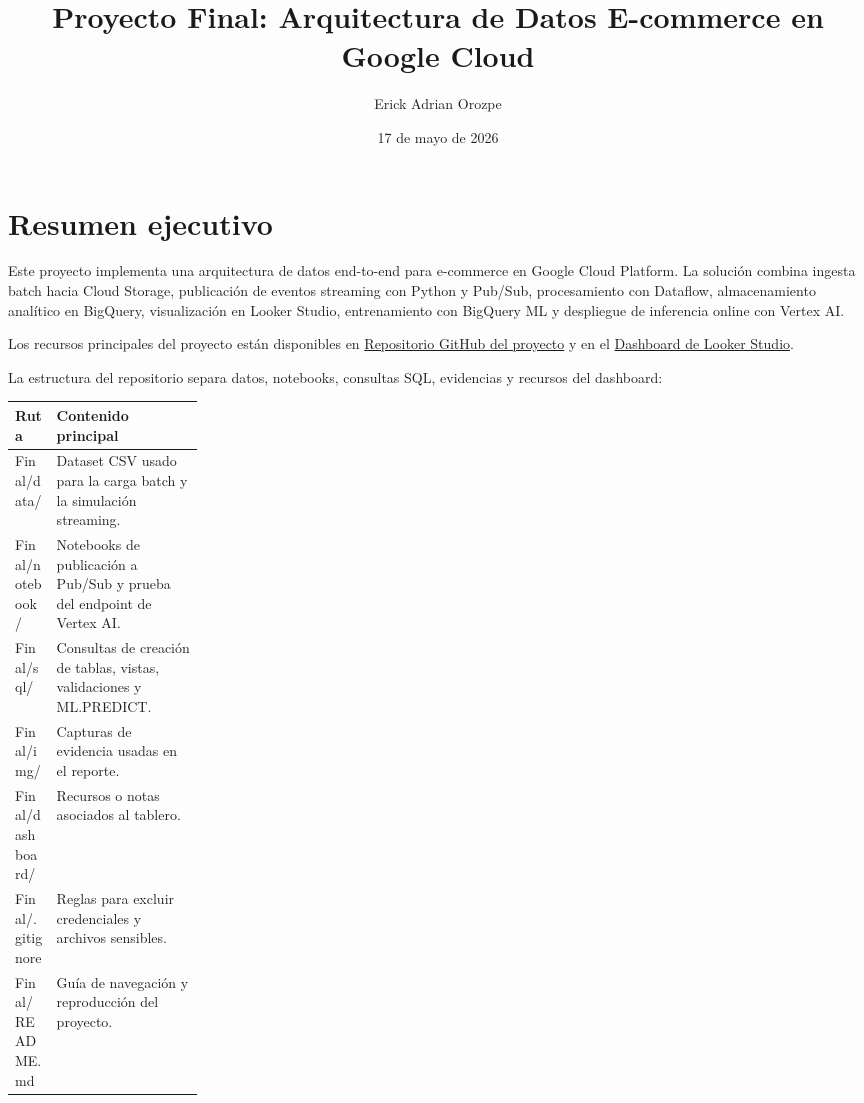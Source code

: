 \documentclass[11pt,letterpaper]{article}
\title{Proyecto Final: Arquitectura de Datos E-commerce en Google Cloud}
\author{Erick Adrian Orozpe}
\date{17 de mayo de 2026}
\begin{document}
\maketitle
\tableofcontents
\newpage

\section*{Resumen ejecutivo}
Este proyecto implementa una arquitectura de datos end-to-end para e-commerce en Google Cloud Platform. La solución combina ingesta batch hacia Cloud Storage, publicación de eventos streaming con Python y Pub/Sub, procesamiento con Dataflow, almacenamiento analítico en BigQuery, visualización en Looker Studio, entrenamiento con BigQuery ML y despliegue de inferencia online con Vertex AI.

Los recursos principales del proyecto están disponibles en \href{https://github.com/Wsm-erick/Certificado/tree/main/Final}{Repositorio GitHub del proyecto} y en el \href{https://datastudio.google.com/reporting/63d4486c-b05e-4c78-a333-cd320dcde35b}{Dashboard de Looker Studio}.

La estructura del repositorio separa datos, notebooks, consultas SQL, evidencias y recursos del dashboard:

\begin{table}[H]
\centering
\renewcommand{\arraystretch}{1.12}
\begin{tabularx}{0.92\linewidth}{>{\ttfamily}p{0.22\linewidth}X}
\toprule
Ruta & Contenido principal \\
\midrule
Final/data/ & Dataset CSV usado para la carga batch y la simulación streaming. \\
Final/notebook/ & Notebooks de publicación a Pub/Sub y prueba del endpoint de Vertex AI. \\
Final/sql/ & Consultas de creación de tablas, vistas, validaciones y ML.PREDICT. \\
Final/img/ & Capturas de evidencia usadas en el reporte. \\
Final/dashboard/ & Recursos o notas asociados al tablero. \\
Final/.gitignore & Reglas para excluir credenciales y archivos sensibles. \\
Final/README.md & Guía de navegación y reproducción del proyecto. \\
\bottomrule
\end{tabularx}
\end{table}
\end{document}
